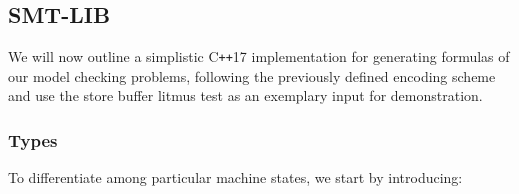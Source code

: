 
\newpage
\subsection{SMT-LIB}

\newcommand{\Cpp}{C\texttt{++}17 }

We will now outline a simplistic \Cpp implementation for generating \SMTLIB formulas of our model checking problems, following the previously defined encoding scheme
and use the store buffer litmus test as an exemplary input for demonstration.

\subsubsection{Types}

To differentiate among particular machine states, we start by introducing:%


